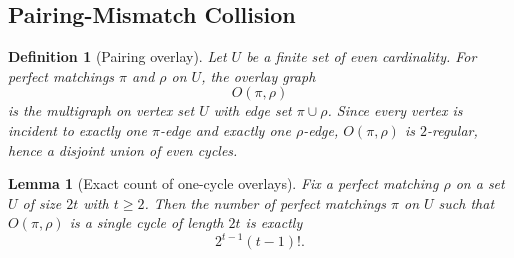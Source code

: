 \documentclass[11pt]{article}
\newtheorem{lemma}[theorem]{Lemma}
\newtheorem{definition}[theorem]{Definition}
\begin{document}
\subsection{Pairing-Mismatch Collision}

\begin{definition}[Pairing overlay]
Let $U$ be a finite set of even cardinality. For perfect matchings $\pi$ and $\rho$ on $U$, the
\emph{overlay graph}
\[
O(\pi,\rho)
\]
is the multigraph on vertex set $U$ with edge set $\pi\cup\rho$. Since every vertex is incident to
exactly one $\pi$-edge and exactly one $\rho$-edge, $O(\pi,\rho)$ is $2$-regular, hence a disjoint
union of even cycles.
\end{definition}

\begin{lemma}[Exact count of one-cycle overlays]\label{lem:one-cycle-overlay-count}
Fix a perfect matching $\rho$ on a set $U$ of size $2t$ with $t\ge 2$. Then the number of perfect
matchings $\pi$ on $U$ such that $O(\pi,\rho)$ is a single cycle of length $2t$ is exactly
\[
2^{t-1}(t-1)!.
\]
\end{lemma}
\end{document}
